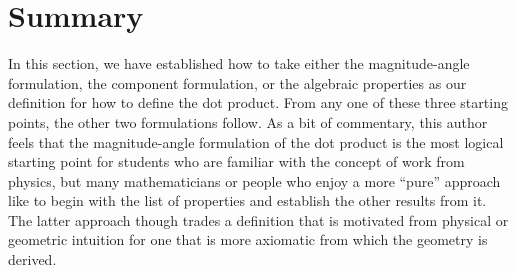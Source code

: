 \documentclass{ximera}
\begin{document}
\section{Summary}
In this section, we have established how to take either the magnitude-angle formulation, the component formulation, or the algebraic properties as our definition for how to define the dot product.  From any one of these three starting points, the other two formulations follow.  As a bit of commentary, this author feels that the magnitude-angle formulation of the dot product is the most logical starting point for students who are familiar with the concept of work from physics, but many mathematicians or people who enjoy a more ``pure'' approach like to begin with the list of properties and establish the other results from it.  The latter approach though trades a definition that is motivated from physical or geometric intuition for one that is more axiomatic from which the geometry is derived.  
\end{document}
